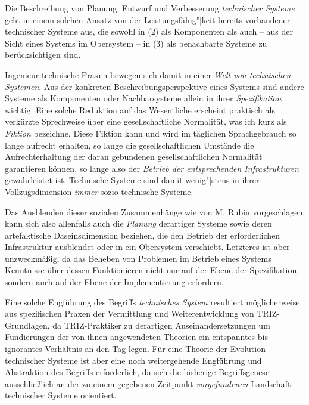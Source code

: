 \documentclass[11pt,a4paper]{article}
\begin{document}
Die Beschreibung von Planung, Entwurf und Verbesserung \emph{technischer
  Systeme} geht in einem solchen Ansatz von der Leistungsfähig"|keit bereits
vorhandener technischer Systeme aus, die sowohl in (2) als Komponenten als
auch -- aus der Sicht eines Systems im Obersystem -- in (3) als benachbarte
Systeme zu berücksichtigen sind.

Ingenieur-technische Praxen bewegen sich damit in einer \emph{Welt von
  technischen Systemen}. Aus der konkreten Beschreibungsperspektive eines
Systems sind andere Systeme als Komponenten oder Nachbarsysteme allein in
ihrer \emph{Spezifikation} wichtig. Eine solche Reduktion auf das Wesentliche
erscheint praktisch als verkürzte Sprechweise über eine gesellschaftliche
Normalität, was ich kurz als \emph{Fiktion} bezeichne.  Diese Fiktion kann und
wird im täglichen Sprachgebrauch so lange aufrecht erhalten, so lange die
gesellschaftlichen Umstände die Aufrechterhaltung der daran gebundenen
gesellschaftlichen Normalität garantieren können, so lange also der
\emph{Betrieb der entsprechenden Infrastrukturen} gewährleistet ist.
Technische Systeme sind damit wenig"|stens in ihrer Vollzugsdimension
\emph{immer} sozio-technische Systeme.

Das Ausblenden dieser sozialen Zusammenhänge wie von M. Rubin vorgeschlagen
kann sich also allenfalls auch die \emph{Planung} derartiger Systeme sowie
deren artefaktische Daseinsdimension beziehen, die den Betrieb der
erforderlichen Infrastruktur ausblendet oder in ein Obersystem verschiebt.
Letzteres ist aber unzweckmäßig, da das Beheben von Problemen im Betrieb eines
Systems Kenntnisse über dessen Funktionieren nicht nur auf der Ebene der
Spezifikation, sondern auch auf der Ebene der Implementierung erfordern.

Eine solche Engführung des Begriffs \emph{technisches System} resultiert
möglicherweise aus spezifischen Praxen der Vermittlung und Weiterentwicklung
von TRIZ-Grundlagen, da TRIZ-Praktiker zu derartigen Auseinandersetzungen um
Fundierungen der von ihnen angewendeten Theorien ein entspanntes bis
ignorantes Verhältnis an den Tag legen. Für eine Theorie der Evolution
technischer Systeme ist aber eine noch weitergehende Engführung und
Abstraktion des Begriffs erforderlich, da sich die bisherige Begriffsgenese
ausschließlich an der zu einem gegebenen Zeitpunkt \emph{vorgefundenen}
Landschaft technischer Systeme orientiert.
\end{document}
